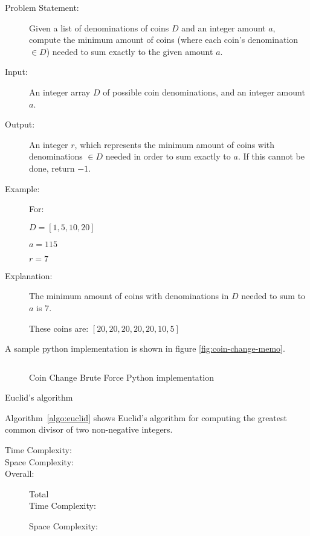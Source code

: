\begin{description}
    \item[Problem Statement:]
        Given a list of denominations of coins $D$ and an integer amount $a$, compute the minimum amount of coins (where each coin's denomination $\in D$) needed to sum exactly to the given amount $a$.
        
    \item[Input:] 
        An integer array $D$ of possible coin denominations, and an integer amount $a$.
        
    \item[Output:] 
        An integer $r$, which represents the minimum amount of coins with denominations $\in D$ needed in order to sum exactly to $a$. If this cannot be done, return $-1$.
        
    \item[Example:]
        For: 

        $D = [1, 5, 10, 20]$

        $a = 115$

        $r = 7$

    \item[Explanation:]
        The minimum amount of coins with denominations in $D$ needed to sum to $a$ is 7.

        These coins are: $[20,20,20,20,20,10,5]$


\end{description}

A sample python implementation is shown in figure \ref{fig:coin-change-memo}.

\begin{figure}[H]
    \centering
    \begin{lstlisting}

    \end{lstlisting}
    \caption{Coin Change Brute Force Python implementation}
    \label{fig:coin-change-bf}
\end{figure}


\begin{algorithm}
    \caption{Euclid's algorithm}
    \label{algo:euclid}
\end{algorithm}

Algorithm~\ref{algo:euclid} shows Euclid's algorithm for computing the greatest common divisor of two non-negative integers.


\begin{description}
    \item[Time Complexity:]
        
        
    \item[Space Complexity:] 
        
        
    \item[Overall:] Total\\
        Time Complexity:
        
        Space Complexity:
        

\end{description}